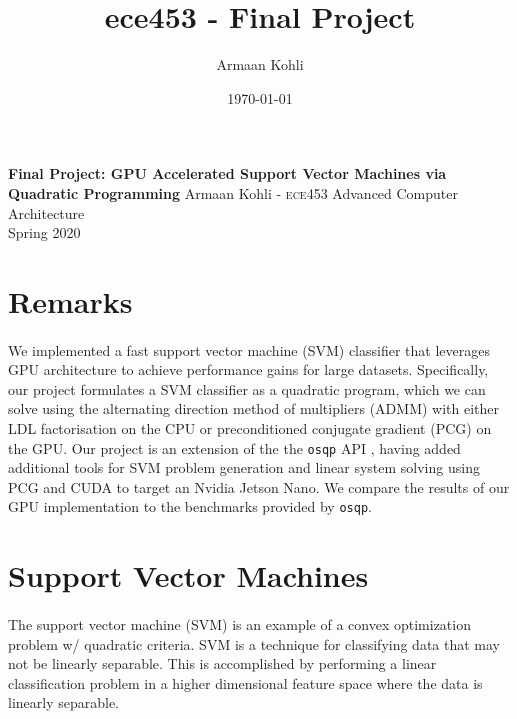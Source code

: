 \documentclass[justified,nobib]{tufte-handout}
\title{ece453 - Final Project}
\author{Armaan Kohli}
\date{\today}
\begin{document}
\begin{fullwidth}
{
  \noindent\fontsize{12pt}{20pt}\selectfont\textbf{Final Project: GPU Accelerated Support Vector Machines via Quadratic Programming}
  \newline
  \fontsize{12pt}{18pt}\selectfont
  {Armaan Kohli - \scshape ece}453 Advanced Computer Architecture \\Spring 2020\\
}
\raggedright
\raggedbottom
\section{Remarks}
\paragraph{} We implemented a fast support vector machine (SVM) classifier that leverages GPU architecture to achieve performance gains for large datasets. Specifically, our project formulates a SVM classifier as a quadratic program, which we can solve using the alternating direction method of multipliers (ADMM) with either LDL factorisation on the CPU or preconditioned conjugate gradient (PCG) on the GPU. Our project is an extension of the the \texttt{osqp} API \cite{osqp}, having added additional tools for SVM problem generation and linear system solving using PCG and CUDA to target an Nvidia Jetson Nano. We compare the results of our GPU implementation to the benchmarks provided by \texttt{osqp}.

\section{Support Vector Machines}
\paragraph{}

The support vector machine (SVM) is an example of a convex optimization problem w/ quadratic criteria. SVM is a technique for classifying data that may not be linearly separable. This is accomplished by performing a linear classification problem in a higher dimensional feature space where the data is linearly separable. 
\end{fullwidth}
\end{document}
